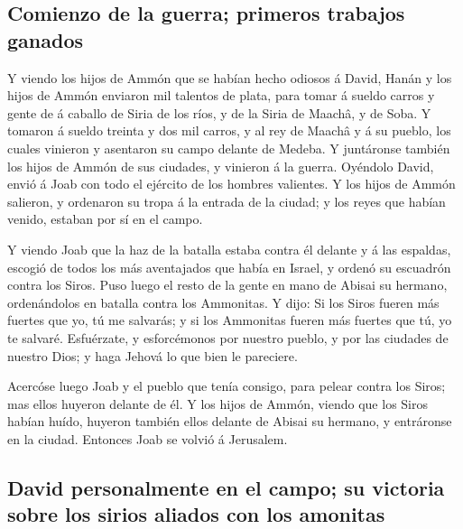 \hypertarget{comienzo-de-la-guerra-primeros-trabajos-ganados}{%
\subsection{Comienzo de la guerra; primeros trabajos
ganados}\label{comienzo-de-la-guerra-primeros-trabajos-ganados}}

 Y viendo los hijos de Ammón que se habían hecho odiosos á
David, Hanán y los hijos de Ammón enviaron mil talentos de plata, para
tomar á sueldo carros y gente de á caballo de Siria de los ríos, y de la
Siria de Maachâ, y de Soba.  Y tomaron á sueldo treinta y
dos mil carros, y al rey de Maachâ y á su pueblo, los cuales vinieron y
asentaron su campo delante de Medeba. Y juntáronse también los hijos de
Ammón de sus ciudades, y vinieron á la guerra.  Oyéndolo
David, envió á Joab con todo el ejército de los hombres valientes.
 Y los hijos de Ammón salieron, y ordenaron su tropa á la
entrada de la ciudad; y los reyes que habían venido, estaban por sí en
el campo.

 Y viendo Joab que la haz de la batalla estaba contra él
delante y á las espaldas, escogió de todos los más aventajados que había
en Israel, y ordenó su escuadrón contra los Siros.  Puso
luego el resto de la gente en mano de Abisai su hermano, ordenándolos en
batalla contra los Ammonitas.  Y dijo: Si los Siros fueren
más fuertes que yo, tú me salvarás; y si los Ammonitas fueren más
fuertes que tú, yo te salvaré.  Esfuérzate, y esforcémonos
por nuestro pueblo, y por las ciudades de nuestro Dios; y haga Jehová lo
que bien le pareciere.

 Acercóse luego Joab y el pueblo que tenía consigo, para
pelear contra los Siros; mas ellos huyeron delante de él. 
Y los hijos de Ammón, viendo que los Siros habían huído, huyeron también
ellos delante de Abisai su hermano, y entráronse en la ciudad. Entonces
Joab se volvió á Jerusalem.

\hypertarget{david-personalmente-en-el-campo-su-victoria-sobre-los-sirios-aliados-con-los-amonitas}{%
\subsection{David personalmente en el campo; su victoria sobre los
sirios aliados con los
amonitas}\label{david-personalmente-en-el-campo-su-victoria-sobre-los-sirios-aliados-con-los-amonitas}}

